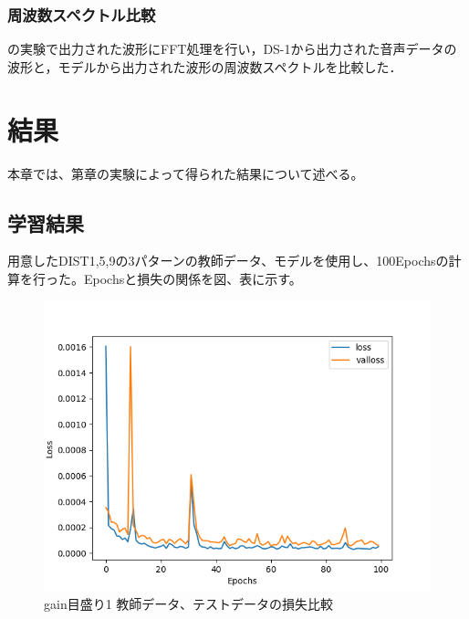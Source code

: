 \documentclass{jreport}		%
\begin{document}
\subsection{周波数スペクトル比較}
の実験で出力された波形にFFT処理を行い，DS-1から出力された音声データの波形と，モデルから出力された波形の周波数スペクトルを比較した．

\chapter{結果}
本章では、第章の実験によって得られた結果について述べる。

\section{学習結果}
用意したDIST1,5,9の3パターンの教師データ、モデルを使用し、100Epochsの計算を行った。Epochsと損失の関係を図、表に示す。
\begin{figure}[htbp]
 \begin{center}
  \includegraphics[width=150mm]{gain1_loss_hikaku.png}
 \end{center}
 \caption{gain目盛り1 教師データ、テストデータの損失比較}
 \label{fig:one}
\end{figure}
\end{document}
